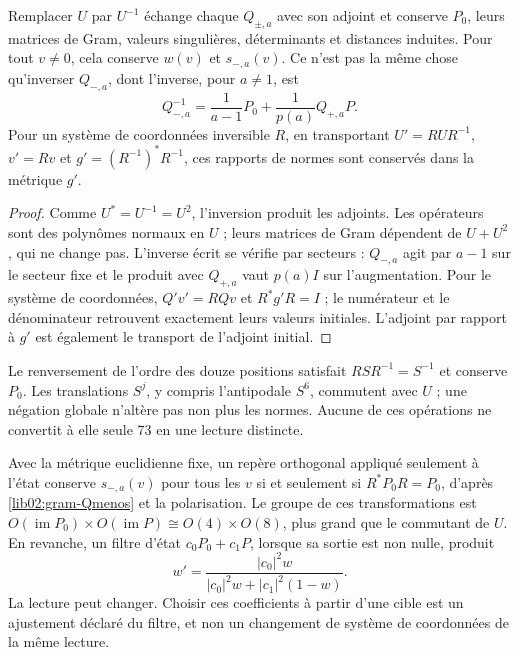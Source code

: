 \begin{proposition}
\label{lib02:inversion-carta}
Remplacer \(U\) par \(U^{-1}\) échange chaque \(Q_{\pm,a}\) avec son adjoint et conserve \(P_0\), leurs matrices de Gram, valeurs singulières, déterminants et distances induites. Pour tout \(v\ne0\), cela conserve \(w(v)\) et \(s_{-,a}(v)\). Ce n'est pas la même chose qu'inverser \(Q_{-,a}\), dont l'inverse, pour \(a\ne1\), est
\begin{equation}
 Q_{-,a}^{-1}
 =\frac1{a-1}P_0+\frac1{p(a)}Q_{+,a}P.
 \label{lib02:inversa-Q}
\end{equation}
Pour un système de coordonnées inversible \(R\), en transportant
\(U'=RUR^{-1}\), \(v'=Rv\) et
\(g'=(R^{-1})^*R^{-1}\), ces rapports de normes sont conservés dans
la métrique \(g'\).
\end{proposition}
\begin{proof}
Comme \(U^*=U^{-1}=U^2\), l’inversion produit les adjoints.
Les opérateurs sont des polynômes normaux en \(U\) ; leurs matrices de Gram dépendent
de \(U+U^2\), qui ne change pas. L’inverse écrit se vérifie par
secteurs : \(Q_{-,a}\) agit par \(a-1\) sur le secteur fixe et le produit
avec \(Q_{+,a}\) vaut \(p(a)I\) sur l’augmentation. Pour le système de coordonnées,
\(Q'v'=RQv\) et \(R^*g'R=I\) ; le numérateur et le dénominateur retrouvent
exactement leurs valeurs initiales. L’adjoint par rapport à \(g'\)
est également le transport de l’adjoint initial.
\end{proof}

Le renversement de l’ordre des douze positions satisfait
\(RSR^{-1}=S^{-1}\) et conserve \(P_0\). Les translations \(S^j\),
y compris l’antipodale \(S^6\), commutent avec \(U\) ; une négation
globale n’altère pas non plus les normes. Aucune de ces opérations ne convertit
à elle seule 73 en une lecture distincte.

Avec la métrique euclidienne fixe, un repère orthogonal appliqué seulement à l'état conserve \(s_{-,a}(v)\) pour tous les \(v\) si et seulement si \(R^*P_0R=P_0\), d'après \eqref{lib02:gram-Qmenos} et la polarisation. Le groupe de ces transformations est \(O(\operatorname{im}P_0)\times O(\operatorname{im}P)
\cong O(4)\times O(8)\), plus grand que le commutant de \(U\). En revanche, un filtre d'état \(c_0P_0+c_1P\), lorsque sa sortie est non nulle, produit
\begin{equation}
 w'=
 \frac{|c_0|^2w}{|c_0|^2w+|c_1|^2(1-w)}.
 \label{lib02:filtro-pesos}
\end{equation}
La lecture peut changer. Choisir ces coefficients à partir d’une cible est
un ajustement déclaré du filtre, et non un changement de système de coordonnées de la même
lecture.

